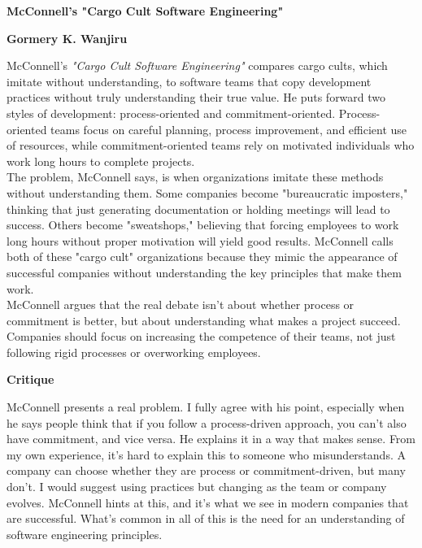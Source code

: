 \documentclass[a4paper, 12pt]{article}
\begin{document}
\noindent
\textbf{McConnell's "Cargo Cult Software Engineering"}

\vspace{0.5cm}

\textbf{Gormery K. Wanjiru}

\vspace{0.5cm}

McConnell’s \textit{"Cargo Cult Software Engineering"} compares cargo cults, which imitate without understanding, to software teams that copy development practices without truly understanding their true value. He puts forward two styles of development: process-oriented and commitment-oriented. Process-oriented teams focus on careful planning, process improvement, and efficient use of resources, while commitment-oriented teams rely on motivated individuals who work long hours to complete projects.\\

The problem, McConnell says, is when organizations imitate these methods without understanding them. Some companies become "bureaucratic imposters," thinking that just generating documentation or holding meetings will lead to success. Others become "sweatshops," believing that forcing employees to work long hours without proper motivation will yield good results. McConnell calls both of these "cargo cult" organizations because they mimic the appearance of successful companies without understanding the key principles that make them work.\\

McConnell argues that the real debate isn't about whether process or commitment is better, but about understanding what makes a project succeed. Companies should focus on increasing the competence of their teams, not just following rigid processes or overworking employees.

\vspace{0.5cm}

\noindent
\textbf{Critique}

\vspace{0.5cm}

McConnell presents a real problem. I fully agree with his point, especially when he says people think that if you follow a process-driven approach, you can't also have commitment, and vice versa. He explains it in a way that makes sense. From my own experience, it’s hard to explain this to someone who misunderstands. A company can choose whether they are process or commitment-driven, but many don’t. I would suggest using practices but changing as the team or company evolves. McConnell hints at this, and it’s what we see in modern companies that are successful. What’s common in all of this is the need for an understanding of software engineering principles.
\end{document}

